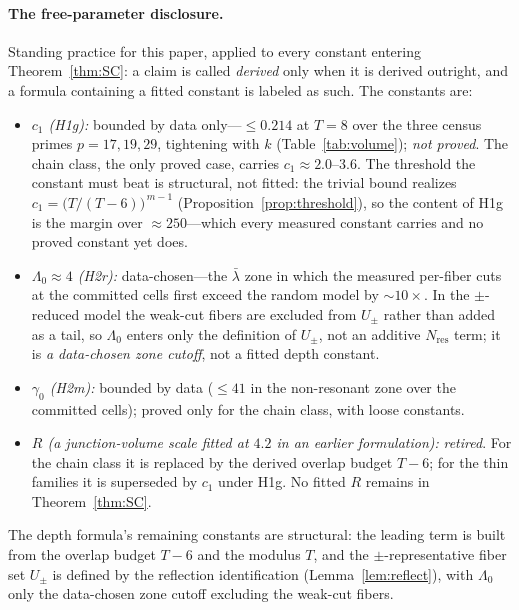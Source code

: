 \documentclass[11pt,a4paper]{article}
\numberwithin{equation}{section}
\theoremstyle{plain}
\theoremstyle{definition}
\theoremstyle{remark}
\begin{document}
\paragraph{The free-parameter disclosure.}
Standing practice for this paper, applied to every constant entering
Theorem~\ref{thm:SC}: a claim is called \emph{derived} only when it is
derived outright, and a formula containing a fitted constant is labeled
as such. The constants are:
\begin{itemize}[leftmargin=2.2em,itemsep=2pt,topsep=2pt]
\item \emph{$c_1$ (H1g):} bounded by data only---$\le 0.214$ at $T=8$
  over the three census primes $p=17,19,29$, tightening with $k$
  (Table~\ref{tab:volume}); \emph{not proved}. The chain class, the only
  proved case, carries $c_1\approx 2.0$--$3.6$. The threshold the
  constant must beat is structural, not fitted: the trivial bound
  realizes $c_1=\bigl(T/(T-6)\bigr)^{\,m-1}$
  (Proposition~\ref{prop:threshold}), so the content of H1g is the
  margin over $\approx250$---which every measured constant carries and
  no proved constant yet does.
\item \emph{$\Lambda_0\approx 4$ (H2r):} data-chosen---the $\bar\lambda$ zone in
which the measured per-fiber cuts at the committed cells first exceed the random
model by $\sim 10\times$. In the $\pm$-reduced model the weak-cut fibers are
excluded from $U_\pm$ rather than added as a tail, so $\Lambda_0$ enters only
the definition of $U_\pm$, not an additive $N_{\mathrm{res}}$ term; it is
\emph{a data-chosen zone cutoff}, not a fitted depth constant.
\item \emph{$\gamma_0$ (H2m):} bounded by data ($\le 41$ in the
  non-resonant zone over the committed cells); proved only for the chain
  class, with loose constants.
\item \emph{$R$ (a junction-volume scale fitted at $4.2$ in an earlier
  formulation):} \emph{retired}. For the chain class it is replaced by
  the derived overlap budget $T-6$; for the thin families it is
  superseded by $c_1$ under H1g. No fitted $R$ remains in
  Theorem~\ref{thm:SC}.
\end{itemize}
The depth formula's remaining constants are structural: the leading
term is built from the overlap budget $T-6$ and the modulus $T$, and the
$\pm$-representative fiber set $U_\pm$ is defined by the reflection
identification (Lemma~\ref{lem:reflect}), with $\Lambda_0$ only the
data-chosen zone cutoff excluding the weak-cut fibers.
\end{document}

